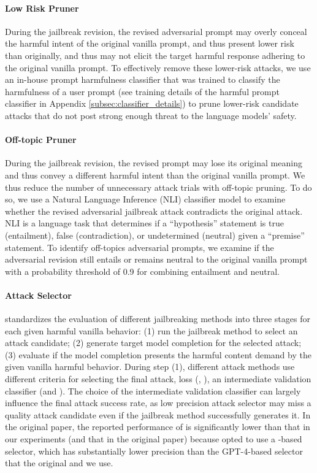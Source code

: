 \paragraph{Low Risk Pruner}
During the jailbreak revision, the revised adversarial prompt may overly conceal the harmful intent of the original vanilla prompt, and thus present lower risk than originally, and thus may not elicit the target harmful response adhering to the original vanilla prompt. To effectively remove these lower-risk attacks, we use an in-house prompt harmfulness classifier that was trained to classify the harmfulness of a user prompt (see training details of the harmful prompt classifier in Appendix \ref{subsec:classifier_details}) to prune lower-risk candidate attacks that do not post strong enough threat to the language models' safety.

\paragraph{Off-topic Pruner}
During the jailbreak revision, the revised prompt may lose its original meaning and thus convey a different harmful intent than the original vanilla prompt. We thus reduce the number of unnecessary attack trials with off-topic pruning. To do so, we use a Natural Language Inference (NLI) classifier model \citep{liu2022wanli} to examine whether the revised adversarial jailbreak attack contradicts the original attack. NLI is a language task that determines if a ``hypothesis'' statement is true (entailment), false (contradiction), or undetermined (neutral) given a ``premise'' statement. To identify off-topics adversarial prompts, we examine if the adversarial revision still entails or remains neutral to the original vanilla prompt with a probability threshold of 0.9 for combining entailment and neutral.

\paragraph{Attack Selector}

\harmbench standardizes the evaluation of different jailbreaking methods into three stages for each given harmful vanilla behavior: (1) run the jailbreak method to select an attack candidate; (2) generate target model completion for the selected attack; (3) evaluate if the model completion presents the harmful content demand by the given vanilla harmful behavior. During step (1), different attack methods use different criteria for selecting the final attack, \eg loss (\gcg, \autodan), an intermediate validation classifier (\pair and \method). The choice of the intermediate validation classifier can largely influence the final attack success rate, as low precision attack selector may miss a quality attack candidate even if the jailbreak method successfully generates it. In the original \harmbench paper, the reported performance of \pair is significantly lower than that in our experiments (and that in the original \pair paper) because \harmbench opted to use a \mixtral-based selector, which has substantially lower precision than the GPT-4-based selector that the original \pair and we use.

